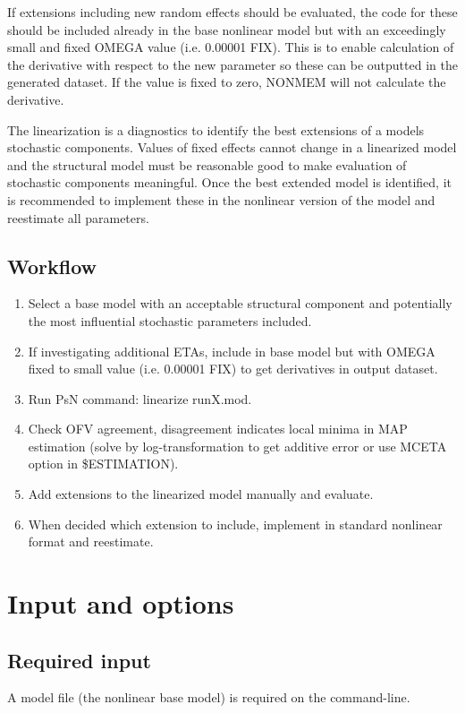 If extensions including new random effects should be evaluated, the code for these should be included already in the base nonlinear model but with an 
exceedingly small and fixed OMEGA value (i.e. 0.00001 FIX). This is to enable calculation of the derivative with respect to the new parameter so these can 
be outputted in the generated dataset. If the value is fixed to zero, NONMEM will not calculate the derivative. 

The linearization is a diagnostics to identify the best extensions of a models stochastic components. Values of fixed effects cannot change in a linearized
model and the structural model must be reasonable good to make evaluation of stochastic components meaningful. Once the best extended model is identified, 
it is recommended to implement these in the nonlinear version of the model and reestimate all parameters.


\subsection{Workflow}
\begin{enumerate}
\item Select a base model with an acceptable structural component and potentially the most influential stochastic parameters included.
\item If investigating additional ETAs, include in base model but with OMEGA fixed to small value (i.e. 0.00001 FIX) to get derivatives in output dataset.
\item Run PsN command: linearize runX.mod.
\item Check OFV agreement, disagreement indicates local minima in MAP estimation (solve by log-transformation to get additive error or use MCETA option
      in \$ESTIMATION).
\item Add extensions to the linearized model manually and evaluate.
\item When decided which extension to include, implement in standard nonlinear format and reestimate.
\end{enumerate}

\section{Input and options}
\subsection{Required input}
A model file (the nonlinear base model) is required on the command-line.

